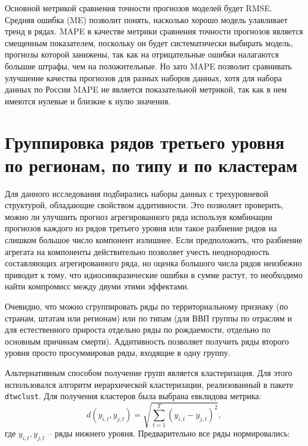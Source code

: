 \documentclass[12pt,a4paper, oneside]{extreport}
\begin{document}



Основной метрикой сравнения точности прогнозов моделей будет  RMSE. Средняя ошибка (ME) позволит понять, насколько хорошо модель улавливает тренд в рядах.  MAPE в качестве метрики сравнения точности прогнозов является смещенным показателем, поскольку он будет систематически выбирать модель, прогнозы которой занижены, так как на отрицательные ошибки налагаются большие штрафы, чем на положительные. 
Но зато MAPE позволит сравнивать улучшение качества прогнозов для разных наборов данных, хотя  для набора данных по России MAPE не является показательной метрикой, так как в нем имеются нулевые и близкие к нулю значения.


\section{Группировка рядов третьего уровня по регионам, по типу и по кластерам}

Для данного исследования подбирались наборы данных с трехуровневой структурой, обладающие свойством аддитивности. Это позволяет проверить,  можно ли улучшить прогноз агрегированного ряда используя  комбинации прогнозов каждого из рядов третьего уровня или такое  разбиение рядов на слишком большое число компонент излишнее. 
 Если предположить, что разбиение агрегата на компоненты действительно позволяет учесть неоднородность составляющих агрегированного ряда, но оценка большого числа рядов неизбежно приводит к тому, что идиосинкразические    ошибки в сумме растут,     то необходимо найти компромисс между двуми этими эффектами.   

Очевидно, что можно сгруппировать ряды по территориальному признаку (по странам, штатам или регионам) или по типам (для ВВП группы по отраслям  и для естественного прироста  отдельно ряды по рождаемости, отдельно по основным причинам  смерти). Аддитивность  позволяет получить ряды второго уровня просто просуммировав ряды, входящие в одну группу. 

Альтернативным способом   получение групп является кластеризация.
 Для этого использовался  алгоритм иерархической кластеризации, реализованный в пакете \texttt{dtwclust}. 
Для получения кластеров была выбрана евклидова метрика:
\begin{equation}\label{key}
d(y_{i,t},y_{j,t}) = \sqrt{\sum^T_{t=1} (y_{i,t} - y_{j,t}  )^2 }, 
\end{equation}
где  $y_{i,t},y_{j,t}$ -- ряды нижнего уровня.
Предварительно все ряды нормировались:
\end{document}
